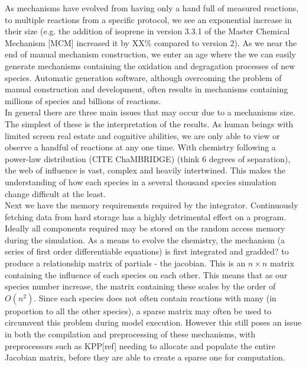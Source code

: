 \documentclass{pasa}%
\begin{document}
 
 
 As mechanisms have evolved from having only a hand full of measured reactions, to multiple reactions from a specific protocol, we see an exponential increase in their size (e.g. the addition of isoprene in version 3.3.1 of the Master Chemical Mechanism [MCM] increased it by XX\% compared to version 2). As we near the end of manual mechanism construction, we enter an age where the we can easily generate mechanisms containing the oxidation and degragation processes of new species. Automatic generation software, although overcoming the problem of manual construction and development, often results in mechanisms containing millions of species and billions of reactions. \\
 
 
 
In general there are three main issues that may occur due to a mechanisms size. The simplest of these is the interpretation of the results. As human beings with limited screen real estate and cognitive abilities, we are only able to view or observe a handful of reactions at any one time. With chemistry following a power-law distribution (CITE ChaMBRIDGE) (think 6 degrees of separation), the web of influence is vast, complex and heavily intertwined. This makes the understanding of how each species in a several thousand species simulation change difficult at the least. \\



Next we have the memory requirements required by the integrator. Continuously fetching data from hard storage has a highly detrimental effect on a program. Ideally all components required may be stored on the random access memory during the simulation. As a means to evolve the chemistry, the mechanism (a series of first order differentiable equations) is first integrated and gradded? to produce a relationship matrix of partials - the jacobian. This is an $n \times n$ matrix containing the influence of each species on each other. This means that as our species number increase, the matrix containing these scales by the order of  $O(n^2)$. Since each species does not often contain reactions with many (in proportion to all the other species), a sparse matrix may often be used to circumvent this problem during model execution. However this still poses an issue in both the compilation and preprocessing of these mechanisms, with preprocessors such as KPP[ref] needing to allocate and populate the entire Jacobian matrix, before they are able to create a sparse one for computation. \\
\end{document}
